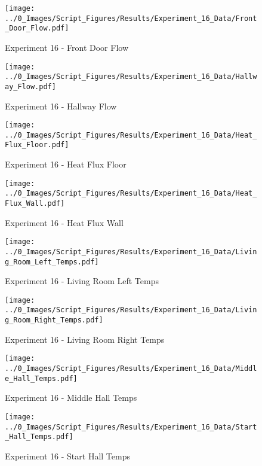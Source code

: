 	\begin{figure}[H]
		\centering
		\texttt{[image: ../0\_Images/Script\_Figures/Results/Experiment\_16\_Data/Front\_Door\_Flow.pdf]}
		\caption[]{Experiment 16 - Front Door Flow}
	\end{figure}
 
	\clearpage

	\begin{figure}[H]
		\centering
		\texttt{[image: ../0\_Images/Script\_Figures/Results/Experiment\_16\_Data/Hallway\_Flow.pdf]}
		\caption[]{Experiment 16 - Hallway Flow}
	\end{figure}
 

	\begin{figure}[H]
		\centering
		\texttt{[image: ../0\_Images/Script\_Figures/Results/Experiment\_16\_Data/Heat\_Flux\_Floor.pdf]}
		\caption[]{Experiment 16 - Heat Flux Floor}
	\end{figure}
 
	\clearpage

	\begin{figure}[H]
		\centering
		\texttt{[image: ../0\_Images/Script\_Figures/Results/Experiment\_16\_Data/Heat\_Flux\_Wall.pdf]}
		\caption[]{Experiment 16 - Heat Flux Wall}
	\end{figure}
 

	\begin{figure}[H]
		\centering
		\texttt{[image: ../0\_Images/Script\_Figures/Results/Experiment\_16\_Data/Living\_Room\_Left\_Temps.pdf]}
		\caption[]{Experiment 16 - Living Room Left Temps}
	\end{figure}
 
	\clearpage

	\begin{figure}[H]
		\centering
		\texttt{[image: ../0\_Images/Script\_Figures/Results/Experiment\_16\_Data/Living\_Room\_Right\_Temps.pdf]}
		\caption[]{Experiment 16 - Living Room Right Temps}
	\end{figure}
 

	\begin{figure}[H]
		\centering
		\texttt{[image: ../0\_Images/Script\_Figures/Results/Experiment\_16\_Data/Middle\_Hall\_Temps.pdf]}
		\caption[]{Experiment 16 - Middle Hall Temps}
	\end{figure}
 
	\clearpage

	\begin{figure}[H]
		\centering
		\texttt{[image: ../0\_Images/Script\_Figures/Results/Experiment\_16\_Data/Start\_Hall\_Temps.pdf]}
		\caption[]{Experiment 16 - Start Hall Temps}
	\end{figure}
 

